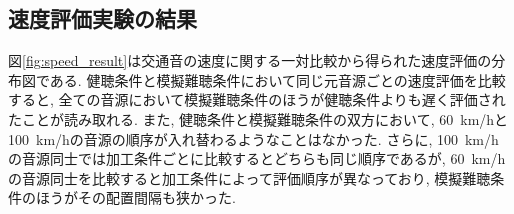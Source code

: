\documentclass[10pt,twocolumn,uplatex,dvipdfmx]{jsarticle} %
\begin{document}
\subsection{速度評価実験の結果}\label{Speed_Rst}
\par
図\ref{fig:speed_result}は交通音の速度に関する一対比較から得られた速度評価の分布図である. 健聴条件と模擬難聴条件において同じ元音源ごとの速度評価を比較すると, 全ての音源において模擬難聴条件のほうが健聴条件よりも遅く評価されたことが読み取れる. また, 健聴条件と模擬難聴条件の双方において, 60~km/hと100~km/hの音源の順序が入れ替わるようなことはなかった. さらに, 100~km/hの音源同士では加工条件ごとに比較するとどちらも同じ順序であるが, 60~km/hの音源同士を比較すると加工条件によって評価順序が異なっており, 模擬難聴条件のほうがその配置間隔も狭かった.





\end{document}
